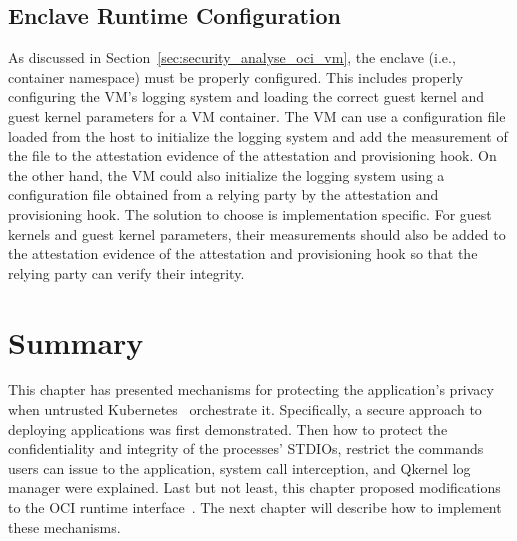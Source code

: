 \subsection{Enclave Runtime Configuration}

As discussed in Section~\ref{sec:security_analyse_oci_vm}, the enclave (i.e., container namespace) must be properly configured. This includes properly configuring the VM's logging system and loading the correct guest kernel and guest kernel parameters for a VM container. The VM can use a configuration file loaded from the host to initialize the logging system 
and add the measurement of the file to the attestation evidence of the attestation and provisioning hook. On the other hand, the VM could also initialize the logging system using a configuration file obtained from a relying party by the attestation and provisioning hook. The solution to choose is implementation specific. For guest kernels and guest kernel parameters, their 
measurements should also be added to the attestation evidence of the attestation and provisioning hook so that the relying party can verify their integrity.
  

\section{Summary}
This chapter has presented mechanisms for protecting the application's privacy when untrusted Kubernetes~\cite*{k8s} orchestrate it. Specifically, a secure approach to deploying applications was first demonstrated. Then how to protect 
the confidentiality and integrity of the processes' STDIOs, restrict the commands users can issue to the application, system call interception, and Qkernel log manager were explained. Last but not least, this chapter proposed modifications to the OCI runtime interface~\cite*{oci-runtime-spec}. 
The next chapter will describe how to implement these mechanisms. 
\cleardoublepage

